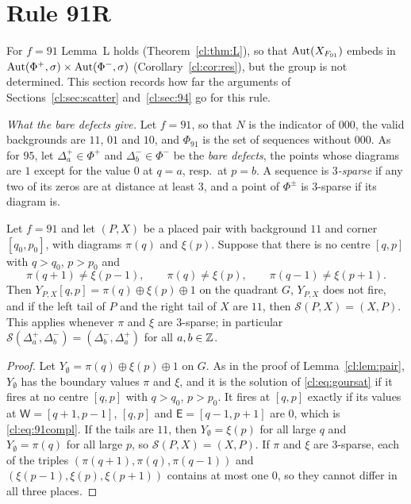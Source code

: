 \section{Rule 91R}\label{cl:sec:91}

For $f=91$ Lemma~L holds (Theorem~\ref{cl:thm:L}), so that $\operatorname{Aut}(X_{F_{91}})$ embeds in $\operatorname{Aut}(\Phi^+,\sigma)\times\operatorname{Aut}(\Phi^-,\sigma)$ (Corollary~\ref{cl:cor:res}), but the group is not determined. This section records how far the arguments of Sections~\ref{cl:sec:scatter} and~\ref{cl:sec:94} go for this rule.

\emph{What the bare defects give.} Let $f=91$, so that $N$ is the indicator of $000$, the valid backgrounds are $11$, $01$ and $10$, and $\Phi_{91}$ is the set of sequences without $000$. As for $95$, let $\Delta^+_a\in\Phi^+$ and $\Delta^-_b\in\Phi^-$ be the \emph{bare defects}, the points whose diagrams are $1$ except for the value $0$ at $q=a$, resp.\ at $p=b$. A sequence is \emph{$3$-sparse} if any two of its zeros are at distance at least $3$, and a point of $\Phi^\pm$ is $3$-sparse if its diagram is.

\begin{lemma}\label{cl:lem:91free}
Let $f=91$ and let $(P,X)$ be a placed pair with background $11$ and corner $[q_0,p_0]$, with diagrams $\pi(q)$ and $\xi(p)$. Suppose that there is no centre $[q,p]$ with $q>q_0$, $p>p_0$ and
\begin{equation}\label{cl:eq:91compl}
\pi(q+1)\ne\xi(p-1),\qquad\pi(q)\ne\xi(p),\qquad\pi(q-1)\ne\xi(p+1).
\end{equation}
Then $Y_{P,X}[q,p]=\pi(q)\oplus\xi(p)\oplus1$ on the quadrant $G$, $Y_{P,X}$ does not fire, and if the left tail of $P$ and the right tail of $X$ are $11$, then $\mathcal S(P,X)=(X,P)$. This applies whenever $\pi$ and $\xi$ are $3$-sparse; in particular $\mathcal S(\Delta^+_a,\Delta^-_b)=(\Delta^-_b,\Delta^+_a)$ for all $a,b\in\mathbb{Z}$.
\end{lemma}

\begin{proof}
Let $Y_\emptyset=\pi(q)\oplus\xi(p)\oplus1$ on $G$. As in the proof of Lemma~\ref{cl:lem:pair}, $Y_\emptyset$ has the boundary values $\pi$ and $\xi$, and it is the solution of \eqref{cl:eq:goursat} if it fires at no centre $[q,p]$ with $q>q_0$, $p>p_0$. It fires at $[q,p]$ exactly if its values at $\mathsf W=[q+1,p-1]$, $[q,p]$ and $\mathsf E=[q-1,p+1]$ are $0$, which is \eqref{cl:eq:91compl}. If the tails are $11$, then $Y_\emptyset=\xi(p)$ for all large $q$ and $Y_\emptyset=\pi(q)$ for all large $p$, so $\mathcal S(P,X)=(X,P)$. If $\pi$ and $\xi$ are $3$-sparse, each of the triples $(\pi(q+1),\pi(q),\pi(q-1))$ and $(\xi(p-1),\xi(p),\xi(p+1))$ contains at most one $0$, so they cannot differ in all three places.
\end{proof}

